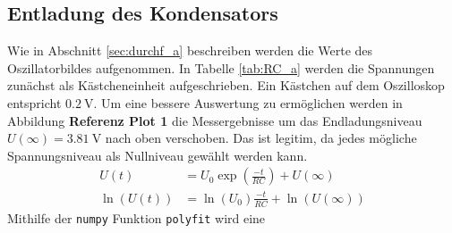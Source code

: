 \subsection{Entladung des Kondensators}

Wie in Abschnitt \ref{sec:durchf_a} beschreiben werden die Werte des Oszillatorbildes aufgenommen. 
In Tabelle \ref{tab:RC_a} werden die Spannungen zunächst als Kästcheneinheit aufgeschrieben.
Ein Kästchen auf dem Oszilloskop entspricht $\qty{0.2}{\volt}$.
Um eine bessere Auswertung zu ermöglichen werden in Abbildung \textbf{Referenz Plot 1} die Messergebnisse 
um das Endladungsniveau $U(\infty) = \qty[]{3.81}{\volt}$ nach oben verschoben.
Das ist legitim, da jedes mögliche Spannungsniveau als Nullniveau gewählt werden kann.
\begin{align}
    U(t)&= U_0 \exp \left(\frac{-t}{RC}\right) + U(\infty) \\
    \ln(U(t)) &= \ln(U_0) \frac{-t}{RC} + \ln(U(\infty))
\end{align}
Mithilfe der \texttt{numpy} Funktion \texttt{polyfit} wird eine 


